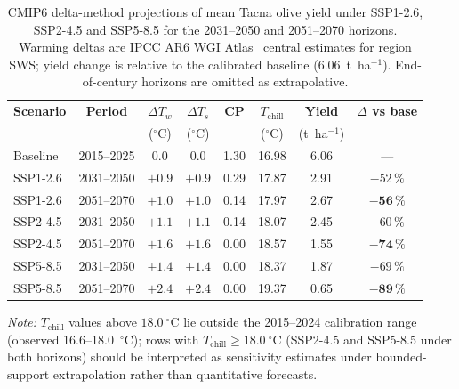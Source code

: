 \begin{table}[H]
\caption{CMIP6 delta-method projections of mean Tacna olive yield under SSP1-2.6, SSP2-4.5 and SSP5-8.5 for the 2031--2050 and 2051--2070 horizons. Warming deltas are IPCC AR6 WGI Atlas~\cite{ipcc2021atlas} central estimates for region SWS; yield change is relative to the calibrated baseline ($6.06$~t~ha$^{-1}$). End-of-century horizons are omitted as extrapolative.\label{tab:cmip6_proj}}
\centering
\small
\begin{tabular}{lccccccc}
\toprule
\textbf{Scenario} & \textbf{Period} & \textbf{$\Delta T_{w}$} & \textbf{$\Delta T_{s}$} & \textbf{CP} & \textbf{$T_{\text{chill}}$} & \textbf{Yield} & \textbf{$\Delta$ vs base} \\
                  &                 & ($^\circ$C)             & ($^\circ$C)             &             & ($^\circ$C)                 & (t~ha$^{-1}$)  &                          \\
\midrule
Baseline & 2015--2025 & 0.0 & 0.0 & 1.30 & 16.98 & 6.06 & --- \\
\midrule
SSP1-2.6 & 2031--2050 & $+0.9$ & $+0.9$ & 0.29 & 17.87 & 2.91 & $-52\,\%$ \\
SSP1-2.6 & 2051--2070 & $+1.0$ & $+1.0$ & 0.14 & 17.97 & 2.67 & $\mathbf{-56\,\%}$ \\
\midrule
SSP2-4.5 & 2031--2050 & $+1.1$ & $+1.1$ & 0.14 & 18.07 & 2.45 & $-60\,\%$ \\
SSP2-4.5 & 2051--2070 & $+1.6$ & $+1.6$ & 0.00 & 18.57 & 1.55 & $\mathbf{-74\,\%}$ \\
\midrule
SSP5-8.5 & 2031--2050 & $+1.4$ & $+1.4$ & 0.00 & 18.37 & 1.87 & $-69\,\%$ \\
SSP5-8.5 & 2051--2070 & $+2.4$ & $+2.4$ & 0.00 & 19.37 & 0.65 & $\mathbf{-89\,\%}$ \\
\bottomrule
\end{tabular}

\vspace{2pt}
\footnotesize\noindent\textit{Note:} $T_{\text{chill}}$ values above $18.0~^\circ$C lie outside the 2015--2024 calibration range (observed 16.6--18.0~$^\circ$C); rows with $T_{\text{chill}}\geq18.0~^\circ$C (SSP2-4.5 and SSP5-8.5 under both horizons) should be interpreted as sensitivity estimates under bounded-support extrapolation rather than quantitative forecasts.
\end{table}
